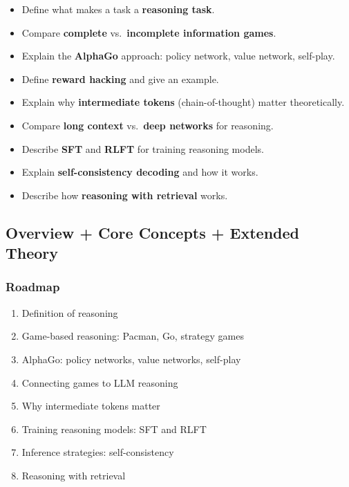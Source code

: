 \begin{itemize}
  \item Define what makes a task a \textbf{reasoning task}.
  \item Compare \textbf{complete} vs.\ \textbf{incomplete information games}.
  \item Explain the \textbf{AlphaGo} approach: policy network, value network, self-play.
  \item Define \textbf{reward hacking} and give an example.
  \item Explain why \textbf{intermediate tokens} (chain-of-thought) matter theoretically.
  \item Compare \textbf{long context} vs.\ \textbf{deep networks} for reasoning.
  \item Describe \textbf{SFT} and \textbf{RLFT} for training reasoning models.
  \item Explain \textbf{self-consistency decoding} and how it works.
  \item Describe how \textbf{reasoning with retrieval} works.
\end{itemize}

\bigseparator

\subsection{Overview + Core Concepts + Extended Theory}

\subsubsection*{Roadmap}
\begin{enumerate}
  \item Definition of reasoning
  \item Game-based reasoning: Pacman, Go, strategy games
  \item AlphaGo: policy networks, value networks, self-play
  \item Connecting games to LLM reasoning
  \item Why intermediate tokens matter
  \item Training reasoning models: SFT and RLFT
  \item Inference strategies: self-consistency
  \item Reasoning with retrieval
\end{enumerate}

